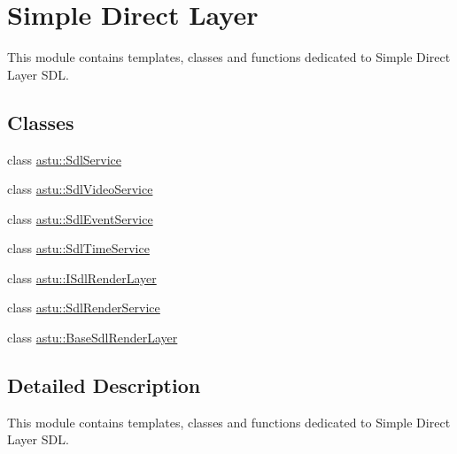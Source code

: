 \hypertarget{group__sdl__group}{}\section{Simple Direct Layer}
\label{group__sdl__group}


This module contains templates, classes and functions dedicated to Simple Direct Layer S\+DL.  


\subsection*{Classes}
\begin{DoxyCompactItemize}
\item 
class \hyperlink{classastu_1_1SdlService}{astu\+::\+Sdl\+Service}
\item 
class \hyperlink{classastu_1_1SdlVideoService}{astu\+::\+Sdl\+Video\+Service}
\item 
class \hyperlink{classastu_1_1SdlEventService}{astu\+::\+Sdl\+Event\+Service}
\item 
class \hyperlink{classastu_1_1SdlTimeService}{astu\+::\+Sdl\+Time\+Service}
\item 
class \hyperlink{classastu_1_1ISdlRenderLayer}{astu\+::\+I\+Sdl\+Render\+Layer}
\item 
class \hyperlink{classastu_1_1SdlRenderService}{astu\+::\+Sdl\+Render\+Service}
\item 
class \hyperlink{classastu_1_1BaseSdlRenderLayer}{astu\+::\+Base\+Sdl\+Render\+Layer}
\end{DoxyCompactItemize}


\subsection{Detailed Description}
This module contains templates, classes and functions dedicated to Simple Direct Layer S\+DL. 

